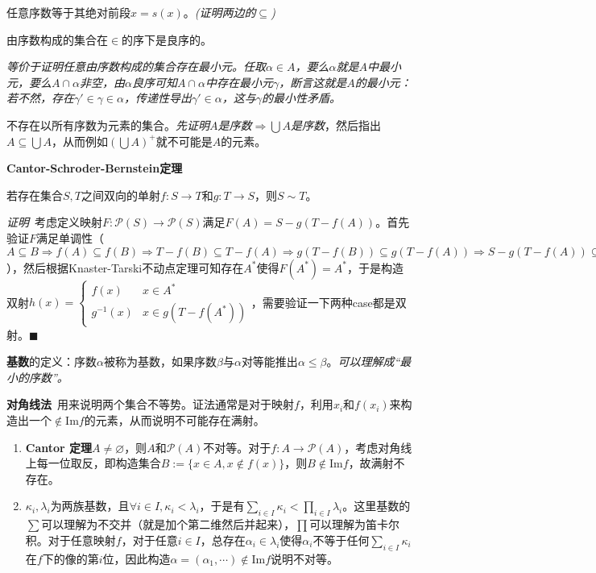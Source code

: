 \documentclass[UTF-8]{ctexart}
\begin{document}
任意序数等于其绝对前段$x = s(x)$。\textit{(证明两边的$\subseteq$)}

由序数构成的集合在$\in$的序下是良序的。

\textit{等价于证明任意由序数构成的集合存在最小元。任取$\alpha \in A$，要么$\alpha$就是$A$中最小元，要么$A \cap \alpha$非空，由$\alpha$良序可知$A \cap \alpha$中存在最小元$\gamma$，断言这就是$A$的最小元：若不然，存在$\gamma' \in \gamma \in \alpha$，传递性导出$\gamma' \in \alpha$，这与$\gamma$的最小性矛盾。}

不存在以所有序数为元素的集合。\textit{先证明$A$是序数$\Rightarrow \bigcup A$是序数}，然后指出$A \subseteq \bigcup A$，从而例如$(\bigcup A)^+$就不可能是$A$的元素。

\textbf{Cantor-Schroder-Bernstein定理}

若存在集合$S, T$之间双向的单射$f: S \to T$和$g: T \to S$，则$S \sim T$。

\textit{证明}\ 考虑定义映射$F: \mathcal P(S) \to \mathcal P(S)$满足$F(A) = S - g(T - f(A))$。首先验证$F$满足单调性（$A \subseteq B \Rightarrow f(A) \subseteq f(B) \Rightarrow T - f(B) \subseteq T - f(A) \Rightarrow g(T - f(B))\subseteq g(T - f(A)) \Rightarrow S - g(T - f(A)) \subseteq S - g(T - f(B))$），然后根据Knaster-Tarski不动点定理可知存在$A^*$使得$F(A^*)= A^*$，于是构造双射$h(x) = \begin{cases}
f(x) & x \in A^*\\g^{-1}(x) & x \in g(T - f(A^*))
\end{cases}$，需要验证一下两种case都是双射。\hfill $\blacksquare$

\textbf{基数}的定义：序数$\alpha$被称为基数，如果序数$\beta$与$\alpha$对等能推出$\alpha \le \beta$。\textit{可以理解成“最小的序数”。}

\textbf{对角线法}\ 用来说明两个集合不等势。证法通常是对于映射$f$，利用$x_i$和$f(x_i)$来构造出一个$\notin \text{Im} f$的元素，从而说明不可能存在满射。
\begin{enumerate}
	\item \textbf{Cantor 定理}$A \neq \varnothing$，则$A$和$\mathcal P(A)$不对等。对于$f: A \to \mathcal P(A)$，考虑对角线上每一位取反，即构造集合$B:= \{x \in A, x \notin f(x)\}$，则$B \notin \text{Im} f$，故满射不存在。
	\item $\kappa_i, \lambda_i$为两族基数，且$\forall i \in I, \kappa_i < \lambda_i$，于是有$\sum_{i \in I}\kappa_i < \prod_{i \in I}\lambda_i$。这里基数的$\sum$可以理解为不交并（就是加个第二维然后并起来），$\prod$可以理解为笛卡尔积。对于任意映射$f$，对于任意$i \in I$，总存在$\alpha_i \in \lambda_i$使得$\alpha_i$不等于任何$\sum_{i \in I}\kappa_i$在$f$下的像的第$i$位，因此构造$\alpha = (\alpha_1, \cdots) \notin \text{Im}f$说明不对等。
\end{enumerate}
\end{document}
